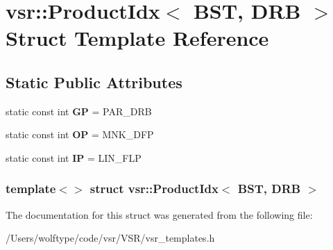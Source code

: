 \hypertarget{structvsr_1_1_product_idx_3_01_b_s_t_00_01_d_r_b_01_4}{\section{vsr\-:\-:Product\-Idx$<$ B\-S\-T, D\-R\-B $>$ Struct Template Reference}
\label{structvsr_1_1_product_idx_3_01_b_s_t_00_01_d_r_b_01_4}
}
\subsection*{Static Public Attributes}
\begin{DoxyCompactItemize}
\item 
\hypertarget{structvsr_1_1_product_idx_3_01_b_s_t_00_01_d_r_b_01_4_a4a4fa1c30a5bff6957f5817a51cb2d56}{static const int {\bfseries G\-P} = P\-A\-R\-\_\-\-D\-R\-B}\label{structvsr_1_1_product_idx_3_01_b_s_t_00_01_d_r_b_01_4_a4a4fa1c30a5bff6957f5817a51cb2d56}

\item 
\hypertarget{structvsr_1_1_product_idx_3_01_b_s_t_00_01_d_r_b_01_4_a24b490efd3675efb51a9be256f85ed79}{static const int {\bfseries O\-P} = M\-N\-K\-\_\-\-D\-F\-P}\label{structvsr_1_1_product_idx_3_01_b_s_t_00_01_d_r_b_01_4_a24b490efd3675efb51a9be256f85ed79}

\item 
\hypertarget{structvsr_1_1_product_idx_3_01_b_s_t_00_01_d_r_b_01_4_a3fe723bdc12ed65b95001d68bbd6f6f1}{static const int {\bfseries I\-P} = L\-I\-N\-\_\-\-F\-L\-P}\label{structvsr_1_1_product_idx_3_01_b_s_t_00_01_d_r_b_01_4_a3fe723bdc12ed65b95001d68bbd6f6f1}

\end{DoxyCompactItemize}
\subsubsection*{template$<$$>$ struct vsr\-::\-Product\-Idx$<$ B\-S\-T, D\-R\-B $>$}



The documentation for this struct was generated from the following file\-:\begin{DoxyCompactItemize}
\item 
/\-Users/wolftype/code/vsr/\-V\-S\-R/vsr\-\_\-templates.\-h\end{DoxyCompactItemize}
